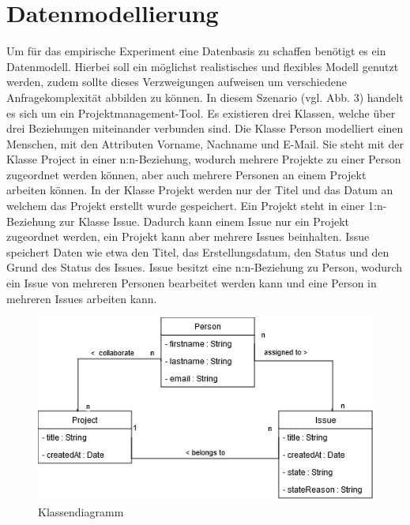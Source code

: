 \chapter{Datenmodellierung} %
\label{sec:datamodelling}
Um für das empirische Experiment eine Datenbasis zu schaffen benötigt es ein Datenmodell. Hierbei soll ein möglichst realistisches und flexibles Modell genutzt werden, zudem sollte dieses Verzweigungen aufweisen um verschiedene Anfragekomplexität abbilden zu können. In diesem Szenario (vgl. Abb. 3) handelt es sich um ein Projektmanagement-Tool. Es existieren drei Klassen, welche über drei Beziehungen miteinander verbunden sind. Die Klasse Person modelliert einen Menschen, mit den Attributen Vorname, Nachname und E-Mail. Sie steht mit der Klasse Project in einer n:n-Beziehung, wodurch mehrere Projekte zu einer Person zugeordnet werden können, aber auch mehrere Personen an einem Projekt arbeiten können. In der Klasse Projekt werden nur der Titel und das Datum an welchem das Projekt erstellt wurde gespeichert. Ein Projekt steht in einer 1:n-Beziehung zur Klasse Issue. Dadurch kann einem Issue nur ein Projekt zugeordnet werden, ein Projekt kann aber mehrere Issues beinhalten. Issue speichert Daten wie etwa den Titel, das Erstellungsdatum, den Status und den Grund des Status des Issues. Issue besitzt eine n:n-Beziehung zu Person, wodurch ein Issue von mehreren Personen bearbeitet werden kann und eine Person in mehreren Issues arbeiten kann.
\vspace{1cm}
\label{sec:datenmodell}
\begin{figure}[h!]
	\centering
	\includegraphics[scale=.8]{Illustrations/class_diagram.png}
	\caption{Klassendiagramm}
\end{figure}



